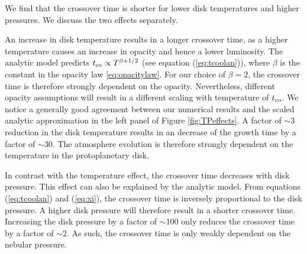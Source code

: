 \documentclass[apj]{emulateapj}
\newcommand{\cb}{_{\rm RCB}}
\begin{document}
We find that the crossover time is shorter for lower disk temperatures and higher pressures. We discuss the two effects separately.

An increase in disk temperature results in a longer crossover time, as a higher temperature causes an increase in opacity and hence a lower luminosity. The analytic model predicts $t_{\rm{co}} \propto T^{\beta+ 1/2}$ (see equation (\ref{eq:tcoolan})), where $\beta$ is the constant in the opacity law \ref{eq:opacitylaw}. For our choice of $\beta=2$, the crossover time is therefore strongly dependent on the opacity. Nevertheless, different opacity assumptions will result in a different scaling with temperature of $t_{\rm{co}}$. We notice a generally good agreement between our numerical results and the scaled analytic approximation in the left panel of Figure \ref{fig:TPeffects}. A factor of $\sim 3$ reduction in the disk temperature results in an decrease of the growth time by a factor of $\sim 30$. The atmosphere evolution is therefore strongly dependent on the temperature in the protoplanetary disk.

In contrast with the temperature effect, the crossover time decreases with disk pressure.  This effect can also be explained by the analytic model. From equations (\ref{eq:tcoolan}) and (\ref{eq:xi}), the crossover time is inversely proportional to the disk pressure. A higher disk pressure will therefore result in a shorter crossover time. Increasing the disk pressure by a factor of $\sim 100$ only reduces the crossover time by a factor of $\sim 2$. As such, the crossover time is only weakly dependent on the nebular pressure.




\end{document}
